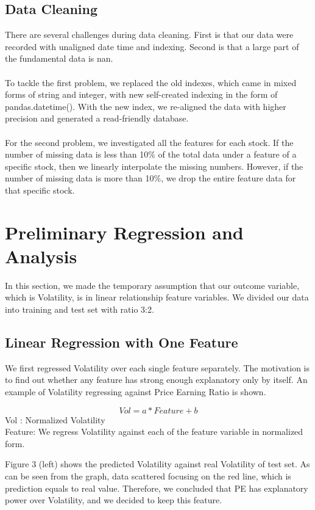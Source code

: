 \documentclass[a4paper]{article}
\begin{document}
\subsection{Data Cleaning}
There are several challenges during data cleaning. First is that our data were recorded with unaligned date time and indexing. Second is that a large part of the fundamental data is nan. 
\\\\To tackle the first problem, we replaced the old indexes, which came in mixed forms of string and integer, with new self-created indexing in the form of pandas.datetime(). With the new index, we re-aligned the data with higher precision and generated a read-friendly database.
\\\\For the second problem, we investigated all the features for each stock. If the number of missing data is less than 10\% of the total data under a feature of a specific stock, then we linearly interpolate the missing numbers. However, if the number of missing data is more than 10\%, we drop the entire feature data for that specific stock.

\section{Preliminary Regression and Analysis}
\label{sec:theory}
In this section, we made the temporary assumption that our outcome variable, which is Volatility, is in linear relationship feature variables. We divided our data into training and test set with ratio 3:2.

\subsection{Linear Regression with One Feature}
We first regressed Volatility over each single feature separately. The motivation is to find out whether any feature has strong enough explanatory only by itself. An example of Volatility regressing against Price Earning Ratio is shown.

\begin{equation}
Vol = a*Feature+b
\end{equation}
Vol : Normalized Volatility
\\Feature: We regress Volatility against each of the feature variable in normalized form.

Figure 3 (left) shows the predicted Volatility against real Volatility of test set. As can be seen from the graph, data scattered focusing on the red line, which is prediction equals to real value. Therefore, we concluded that PE has explanatory power over Volatility, and we decided to keep this feature.
\end{document}

